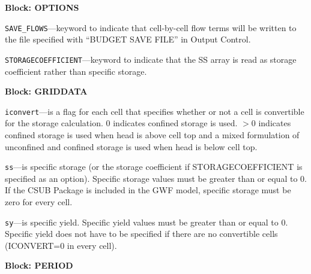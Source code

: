 
\item \textbf{Block: OPTIONS}

\begin{description}
\item \texttt{SAVE\_FLOWS}---keyword to indicate that cell-by-cell flow terms will be written to the file specified with ``BUDGET SAVE FILE'' in Output Control.

\item \texttt{STORAGECOEFFICIENT}---keyword to indicate that the SS array is read as storage coefficient rather than specific storage.

\end{description}
\item \textbf{Block: GRIDDATA}

\begin{description}
\item \texttt{iconvert}---is a flag for each cell that specifies whether or not a cell is convertible for the storage calculation. 0 indicates confined storage is used. $>$0 indicates confined storage is used when head is above cell top and a mixed formulation of unconfined and confined storage is used when head is below cell top.

\item \texttt{ss}---is specific storage (or the storage coefficient if STORAGECOEFFICIENT is specified as an option). Specific storage values must be greater than or equal to 0. If the CSUB Package is included in the GWF model, specific storage must be zero for every cell.

\item \texttt{sy}---is specific yield. Specific yield values must be greater than or equal to 0. Specific yield does not have to be specified if there are no convertible cells (ICONVERT=0 in every cell).

\end{description}
\item \textbf{Block: PERIOD}

